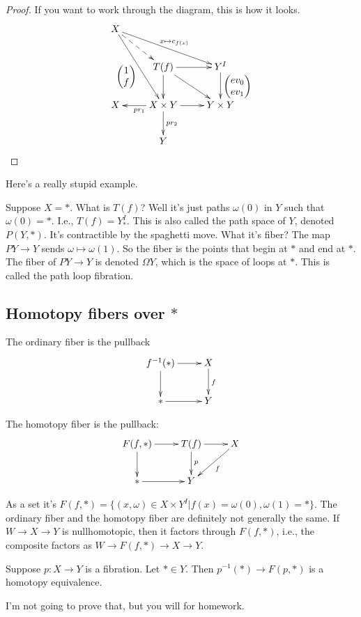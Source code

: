 \begin{proof}
	    If you want to work through the diagram, this is how it looks.
	    \begin{equation*}
		\xymatrix{
		    X\ar@{-->}[dr]\ar[drr]^{x\mapsto c_{f(x)}}\ar[ddr]_{\begin{pmatrix}1 \\ f\end{pmatrix}} & & \\
			& T(f)\ar[d]\ar[r]\ar[dr] & Y^I\ar[d]^{\begin{pmatrix}ev_0 \\ ev_1\end{pmatrix}}\\
			    X & X\times Y\ar[l]^{pr_1}\ar[d]^{pr_2}\ar[r] & Y\times Y\\
		    & Y
		    }
	    \end{equation*}
\end{proof}
Here's a really stupid example. 
\begin{example}
Suppose $X=\ast$. What is $T(f)$? Well it's just paths $\omega(0)$ in $Y$ such that $\omega(0)=\ast$. I.e., $T(f) = Y^I_\ast$. This is also called the path space of $Y$, denoted $P(Y,\ast)$. It's contractible by the spaghetti move. What it's fiber? The map $PY\to Y$ sends $\omega\mapsto \omega(1)$. So the fiber is the points that begin at $\ast$ and end at $\ast$. The fiber of $PY\to Y$ is denoted $\Omega Y$, which is the space of loops at $\ast$. This is called the path loop fibration. 
\end{example}
\subsection{Homotopy fibers over $\ast$}
The ordinary fiber is the pullback
\begin{equation*}
    \xymatrix{
	f^{-1}(\ast)\ar[r]\ar[d] & X\ar[d]^f\\
	\ast\ar[r] & Y
    }
\end{equation*}
\begin{definition}
    The homotopy fiber is the pullback:
    \begin{equation*}
	\xymatrix{
	    F(f,\ast)\ar[r]\ar[d] & T(f)\ar[r]\ar[d]^p & X\ar[dl]^f\\
	    \ast \ar[r] & Y &
	    }
    \end{equation*}
\end{definition}
As a set it's $F(f,\ast) = \{(x,\omega)\in X\times Y^I| f(x) = \omega(0), \omega(1) = \ast\}$. The ordinary fiber and the homotopy fiber are definitely not generally the same. If $W\to X\to Y$ is nullhomotopic, then it factors through $F(f,\ast)$, i.e., the composite factors as $W\to F(f,\ast)\to X\to Y$.
\begin{prop}
    Suppose $p:X\to Y$ is a fibration. Let $\ast\in Y$. Then $p^{-1}(\ast)\to F(p,\ast)$ is a homotopy equivalence.
\end{prop}
I'm not going to prove that, but you will for homework.

